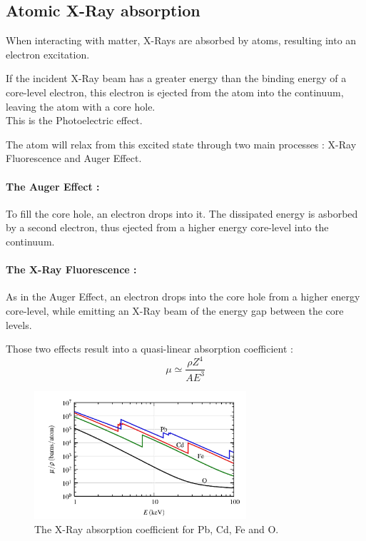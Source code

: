 \documentclass[11pt,a4paper,oneside]{report}
\begin{document}
\subsection{Atomic X-Ray absorption}

When interacting with matter, X-Rays are absorbed by atoms, resulting into an electron excitation.

If the incident X-Ray beam has a greater energy than the binding energy of a core-level electron, this electron is ejected from the atom into the continuum, leaving the atom with a core hole\cite{Pres}.\\This is the Photoelectric effect.

The atom will relax from this excited state through two main processes : X-Ray Fluorescence and Auger Effect.

\paragraph{The Auger Effect :} To fill the core hole, an electron drops into it. The dissipated energy is asborbed by a second electron, thus ejected from a higher energy core-level into the continuum.

\paragraph{The X-Ray Fluorescence :} As in the Auger Effect, an electron drops into the core hole from a higher energy core-level, while emitting an X-Ray beam of the energy gap between the core levels.

Those two effects result into a quasi-linear absorption coefficient :
\[\mu \simeq \frac{\rho Z^4}{A E^3}\]
\begin{figure}[H]
    \begin{center}
        \includegraphics[width=0.7\textwidth]{Images/AbsorptionCoeff}
        \caption{The X-Ray absorption coefficient for Pb, Cd, Fe and O.}
        \label{absorptionCoeff}
    \end{center}
\end{figure}
\end{document}
